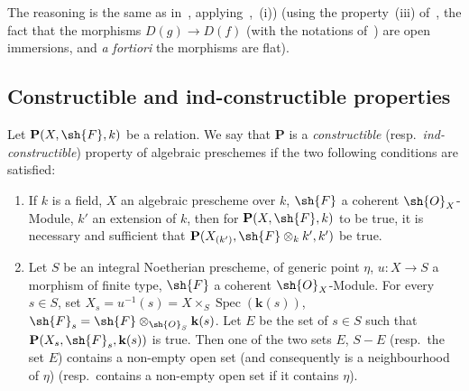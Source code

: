The reasoning is the same as in~, applying~,~(i)) (using the property~(iii) of~, the fact that the morphisms $D(g)\to D(f)$ (with the notations of~) are open immersions, and \emph{a fortiori} the morphisms are flat).

\subsection{Constructible and ind-constructible properties}
\label{subsection:IV.9.2}
\label{IV.9.2}

\begin{definition}[9.2.1]
\label{IV.9.2.1}
Let $\mathbf{P}(X,\sh{F},k)$ be a relation.
We say that $\mathbf{P}$ is a \emph{constructible} (resp.\ \emph{ind-constructible}) property of algebraic preschemes if the two following conditions are satisfied:
\begin{enumerate}[label=(\roman*)]
  \item If $k$ is a field, $X$ an algebraic prescheme over $k$, $\sh{F}$ a coherent $\sh{O}_X$-Module, $k'$ an extension of $k$, then for $\mathbf{P}(X,\sh{F},k)$ to be true, it is necessary and sufficient that $\mathbf{P}(X_{(k')},\sh{F}\otimes_k k',k')$ be true.
  \item Let $S$ be an integral Noetherian prescheme, of generic point $\eta$, $u:X\to S$ a morphism of finite type, $\sh{F}$ a coherent $\sh{O}_X$-Module.
For every $s\in S$, set $X_s=u^{-1}(s)=X\times_S\operatorname{Spec}(\mathbf{k}(s))$, $\sh{F}_s=\sh{F}\otimes_{\sh{O}_S}\mathbf{k}(s)$.
Let $E$ be the set of $s\in S$ such that $\mathbf{P}(X_s,\sh{F}_s,\mathbf{k}(s))$ is true.
Then one of the two sets $E$, $S-E$ (resp.\ the set $E$) contains a non-empty open set (and consequently is a neighbourhood of $\eta$) (resp.\ contains a non-empty open set if it contains $\eta$).
\end{enumerate}
\end{definition}


